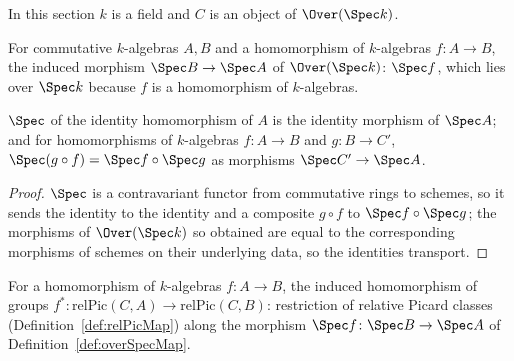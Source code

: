 In this section \(k\) is a field and \(C\) is an object of \(\Over(\Spec k)\).

\begin{definition}
  \label{def:overSpecMap}
  \leanok
  For commutative \(k\)-algebras \(A, B\) and a homomorphism of \(k\)-algebras
  \(f \colon A \to B\), the induced morphism \(\Spec B \to \Spec A\) of \(\Over(\Spec k)\):
  \(\Spec f\), which lies over \(\Spec k\) because \(f\) is a homomorphism of \(k\)-algebras.
\end{definition}

\begin{lemma}
  \label{lem:overSpecMap_functor}
  \leanok
  \(\Spec\) of the identity homomorphism of \(A\) is the identity morphism of \(\Spec A\); and
  for homomorphisms of \(k\)-algebras \(f \colon A \to B\) and \(g \colon B \to C'\),
  \(\Spec(g \circ f) = \Spec f \circ \Spec g\) as morphisms \(\Spec C' \to \Spec A\).
\end{lemma}
\begin{proof}
  \leanok
  \(\Spec\) is a contravariant functor from commutative rings to schemes, so it sends the
  identity to the identity and a composite \(g \circ f\) to \(\Spec f \circ \Spec g\); the
  morphisms of \(\Over(\Spec k)\) so obtained are equal to the corresponding morphisms of
  schemes on their underlying data, so the identities transport.
\end{proof}

\begin{definition}
  \label{def:relPicAlgMap}
  \leanok
  For a homomorphism of \(k\)-algebras \(f \colon A \to B\), the induced homomorphism of groups
  \(f^{*} \colon \mathrm{relPic}(C,A) \to \mathrm{relPic}(C,B)\): restriction of relative
  Picard classes (Definition~\ref{def:relPicMap}) along the morphism
  \(\Spec f \colon \Spec B \to \Spec A\) of Definition~\ref{def:overSpecMap}.
\end{definition}

